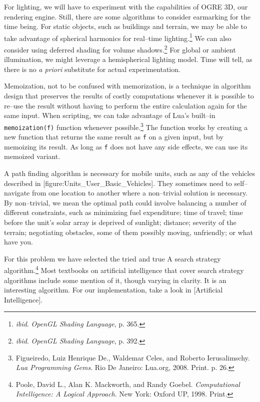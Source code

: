 For lighting, we will have to experiment with the capabilities of OGRE 3D, our rendering engine. Still, there are some algorithms to consider earmarking for the time being. For static objects, such as buildings and terrain, we may be able to take advantage of spherical harmonics for real--time lighting.\footnote{{\it ibid}. {\it OpenGL Shading Language}, p. 365.} We can also consider using deferred shading for volume shadows.\footnote{{\it ibid}. {\it OpenGL Shading Language}, p. 392.} For global or ambient illumination, we might leverage a hemispherical lighting model. Time will tell, as there is no {\it a priori} substitute for actual experimentation.

Memoization, not to be confused with memorization, is a technique in algorithm design that preserves the results of costly computations whenever it is possible to re--use the result without having to perform the entire calculation again for the same input. When scripting, we can take advantage of Lua's built--in {\tt memoization(f)} function whenever possible.\footnote{ Figueiredo, Luiz Henrique De., Waldemar Celes, and Roberto Ierusalimschy. {\it Lua Programming Gems}. Rio De Janeiro: Lua.org, 2008. Print. p. 26.} The function works by creating a new function that returns the same result as {\tt f} on a given input, but by memoizing its result. As long as {\tt f} does not have any side effects, we can use its memoized variant.

A path finding algorithm is necessary for mobile units, such as any of the vehicles described in [figure:Units_User_Basic_Vehicles]. They sometimes need to self--navigate from one location to another where a non--trivial solution is necessary. By non--trivial, we mean the optimal path could involve balancing a number of different constraints, such as minimizing fuel expenditure; time of travel; time before the unit's solar array is deprived of sunlight; distance; severity of the terrain; negotiating obstacles, some of them possibly moving, unfriendly; or what have you.

For this problem we have selected the tried and true A\high{*} search strategy algorithm.\footnote{Poole, David L., Alan K. Mackworth, and Randy Goebel. {\it Computational Intelligence: A Logical Approach}. New York: Oxford UP, 1998. Print.} Most textbooks on artificial intelligence that cover search strategy algorithms include some mention of it, though varying in clarity. It is an interesting algorithm. For our implementation, take a look in [Artificial Intelligence].

